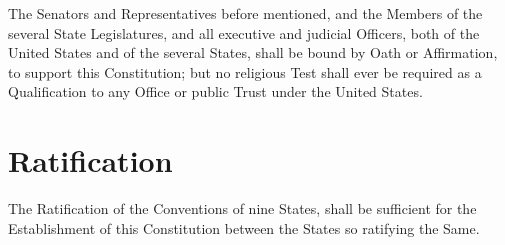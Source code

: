 \documentclass{constitution}
\begin{document}
The Senators and Representatives before mentioned,
and the Members of the several State Legislatures,
and all executive and judicial Officers, both of the United States and of the several States,
shall be bound by Oath or Affirmation, to support this Constitution;
but no religious Test shall ever be required as a Qualification to any Office or public Trust under the United States.

\chapter{Ratification}
The Ratification of the Conventions of nine States,
shall be sufficient for the Establishment of this Constitution between the States so ratifying the Same.
\end{document}
